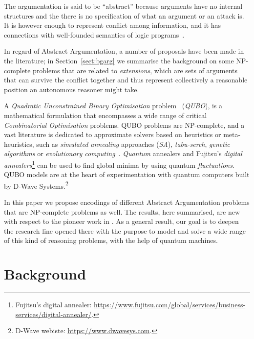 \documentclass[conference]{IEEEtran}
\begin{document}
The argumentation is said to be ``abstract'' because arguments have no internal structures and the there is no specification of what an argument or an attack is. It is however enough to represent conflict among information, and it has connections with well-founded semantics of logic programs~\cite{Dung:1995}.

In regard of Abstract Argumentation, a number of proposals have been made in the literature; in Section~\ref{sect:bgarg} we summarise the background on  some NP-complete problems  that are related to \emph{extensions}, which are sets of arguments that can survive the conflict together and thus represent collectively a reasonable position an autonomous reasoner might take. 


A \emph{Quadratic Unconstrained Binary Optimisation} problem~\cite{firstworkqubo} (\emph{QUBO}),  is a mathematical formulation that  encompasses a wide range of critical \emph{Combinatorial Optimisation} problems.  QUBO problems are  NP-complete, and a vast literature is dedicated to approximate solvers  based on heuristics or meta-heuristics, such as  \emph{simulated annealing} approaches (\emph{SA}), \emph{tabu-serch}, \emph{genetic algorithms} or \emph{evolutionary computing}~\cite{survey1}. \emph{Quantum} annealers  and Fujitsu's \emph{digital annealers}\footnote{Fujitsu's digital annealer: \url{https://www.fujitsu.com/global/services/business-services/digital-annealer/}.} can be used to find global minima by using quantum \emph{fluctuations}.  QUBO models are  at the heart of experimentation with quantum computers built by D-Wave Systems.\footnote{D-Wave webiste: \url{https://www.dwavesys.com}.}

In this paper we propose encodings of different Abstract Argumentation problems that are NP-complete problems as well. The  results, here summarised, are new with respect to the pioneer  work in \cite{pricai22}. As a general result, our goal is to deepen  the research line opened there with the purpose to model  and solve a wide range of this kind of reasoning problems, with the help of quantum machines.

\section{Background}\label{sect:background}
\end{document}
